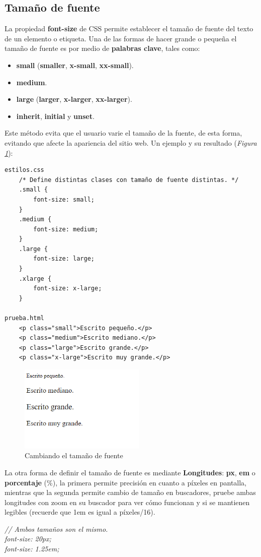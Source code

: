 \subsection{Tamaño de fuente}

La propiedad \textbf{font-size} de CSS permite establecer el tamaño de fuente del texto de un elemento o etiqueta. Una de las formas de hacer grande o pequeña el tamaño de fuente es por medio de \textbf{palabras clave}, tales como:
\begin{itemize}
    \item \textbf{small} (\textbf{smaller}, \textbf{x-small}, \textbf{xx-small}).
    \item \textbf{medium}.
    \item \textbf{large} (\textbf{larger}, \textbf{x-larger}, \textbf{xx-larger}).
    \item \textbf{inherit}, \textbf{initial} y \textbf{unset}.
\end{itemize}

Este método evita que el usuario varie el tamaño de la fuente, de esta forma, evitando que afecte la apariencia del sitio web. Un ejemplo y su resultado (\textit{Figura \ref{fig: 4}}):
\begin{lstlisting}
estilos.css
    /* Define distintas clases con tamaño de fuente distintas. */
    .small {
        font-size: small;
    }
    .medium {
        font-size: medium;
    }
    .large {
        font-size: large;
    }
    .xlarge {
        font-size: x-large;
    }

prueba.html
    <p class="small">Escrito pequeño.</p>
    <p class="medium">Escrito mediano.</p> 
    <p class="large">Escrito grande.</p> 
    <p class="x-large">Escrito muy grande.</p>
\end{lstlisting}
\begin{figure}[H]
    \centering
    \caption{Cambiando el tamaño de fuente}
    \label{fig: 4}
    \includegraphics[width=6cm]{ss/fuentes-tam.png}
\end{figure}

La otra forma de definir el tamaño de fuente es mediante \textbf{Longitudes}: \textbf{px}, \textbf{em} o \textbf{porcentaje} (\%), la primera permite precisión en cuanto a píxeles en pantalla, mientras que la segunda permite cambio de tamaño en buscadores, pruebe ambas longitudes con zoom en su buscador para ver cómo funcionan y si se mantienen legibles (recuerde que 1em es igual a píxeles/16).
\begin{center}
    \textit{
        // Ambos tamaños son el mismo. \\
        font-size: 20px; \\
        font-size: 1.25em; \\
    }
\end{center}


